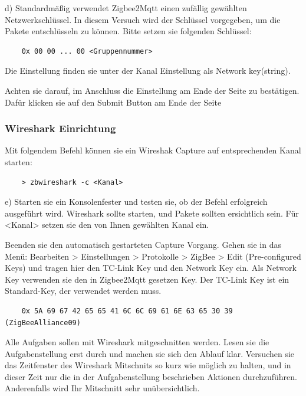 d) Standardmäßig verwendet Zigbee2Mqtt einen zufällig gewählten Netzwerkschlüssel. In diesem Versuch wird der Schlüssel vorgegeben, um die Pakete
entschlüsseln zu können. Bitte setzen sie folgenden Schlüssel:

\begin{lstlisting}
    0x 00 00 ... 00 <Gruppennummer>
\end{lstlisting}

Die Einstellung finden sie unter der Kanal Einstellung als \grqq Network key(string)\grqq{}.

Achten sie darauf, im Anschluss die Einstellung am Ende der Seite zu bestätigen. Dafür klicken sie auf den 
\grqq Submit \grqq{} Button am Ende der Seite

\subsubsection{Wireshark Einrichtung}

Mit folgendem Befehl können sie ein Wireshak Capture auf entsprechenden Kanal starten:

\begin{lstlisting}
    > zbwireshark -c <Kanal>
\end{lstlisting}

e) Starten sie ein Konsolenfester und testen sie, ob der Befehl erfolgreich ausgeführt wird. Wireshark sollte starten, und Pakete sollten ersichtlich sein. Für \grqq 
<Kanal> \grqq{} setzen sie den von Ihnen gewählten Kanal ein.

Beenden sie den automatisch gestarteten Capture Vorgang. Gehen sie in das Menü: Bearbeiten > Einstellungen > Protokolle > ZigBee > Edit (Pre-configured Keys) und tragen
hier den \grqq TC-Link Key\grqq{} und den \grqq Network Key\grqq{} ein. Als \grqq Network Key\grqq{} verwenden sie den in Zigbee2Mqtt gesetzen Key. Der \grqq TC-Link Key\grqq{} ist ein
Standard-Key, der verwendet werden muss.
\begin{lstlisting}
    0x 5A 69 67 42 65 65 41 6C 6C 69 61 6E 63 65 30 39 (ZigBeeAlliance09)
\end{lstlisting}

\begin{Hinweis}
    Alle Aufgaben sollen mit Wireshark mitgeschnitten werden. Lesen sie die Aufgabenstellung erst durch und machen sie sich den Ablauf klar. Versuchen sie das 
    Zeitfenster des Wireshark Mitschnits so kurz wie möglich zu halten, und in dieser Zeit nur die in der Aufgabenstellung beschrieben Aktionen durchzuführen.
    Anderenfalls wird Ihr Mitschnitt sehr unübersichtlich.
\end{Hinweis}

